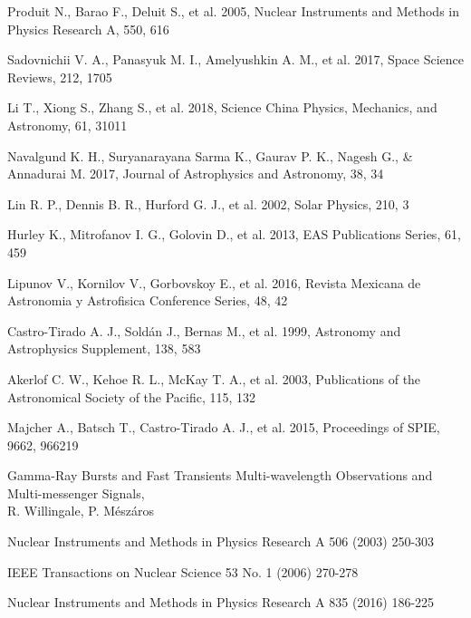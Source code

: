 \documentclass[12pt, a4paper,titlepage]{article}
\numberwithin{equation}{section}
\numberwithin{figure}{section}
\begin{document}
\begin{thebibliography}{99}
 Produit N., Barao F., Deluit S., et al. 2005, Nuclear Instruments and Methods in Physics Research A,
550, 616

 Sadovnichii V. A., Panasyuk M. I., Amelyushkin A. M., et al. 2017, Space Science Reviews, 212, 1705

 Li T., Xiong S., Zhang S., et al. 2018, Science China Physics, Mechanics, and Astronomy, 61, 31011

 Navalgund K. H., Suryanarayana Sarma K., Gaurav P. K., Nagesh G., \& Annadurai M. 2017, Journal of Astrophysics and Astronomy, 38, 34

 Lin R. P., Dennis B. R., Hurford G. J., et al. 2002, Solar Physics, 210, 3

 Hurley K., Mitrofanov I. G., Golovin D., et al. 2013, EAS Publications Series, 61, 459 

 Lipunov V., Kornilov V., Gorbovskoy E., et al. 2016, Revista Mexicana de Astronomia y Astrofisica
Conference Series, 48, 42

 Castro-Tirado A. J., Soldán J., Bernas M., et al. 1999, Astronomy and Astrophysics Supplement, 138, 583

 Akerlof C. W., Kehoe R. L., McKay T. A., et al. 2003, Publications of the Astronomical Society of the Pacific, 115, 132

 Majcher A., Batsch T., Castro-Tirado A. J., et al. 2015, Proceedings of SPIE, 9662, 966219

 Gamma-Ray Bursts and Fast Transients
Multi-wavelength Observations and Multi-messenger Signals,\\
R. Willingale, P. Mészáros

 Nuclear Instruments and Methods in Physics Research A 506 (2003) 250-303

 IEEE Transactions on Nuclear Science 53 No. 1 (2006) 270-278

 Nuclear Instruments and Methods in Physics Research A 835 (2016) 186-225

\end{thebibliography}

\pagebreak
\end{document}
